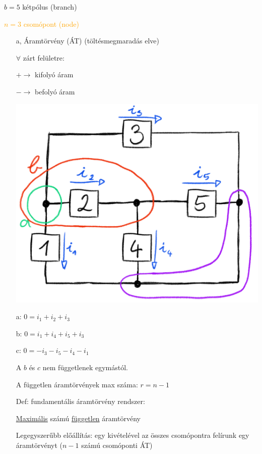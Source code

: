 \documentclass[12pt]{article}
\begin{document}
            $b = 5$ kétpólus (branch)

            \textcolor{orange}{$n = 3$ csomópont (node)}

            \begin{itemize}
                \item[a,] Áramtörvény (ÁT) (töltésmegmaradás elve)
                 
                    $ \forall$ zárt felületre: 

                    $+ \rightarrow$ kifolyó áram

                    $- \rightarrow$ befolyó áram

                    \includegraphics{img/8.png}

                    a: $0=i_1+i_2+i_3$

                    b: $0=i_1+i_4+i_5+i_3$
                    
                    c: $0=-i_3-i_5-i_4-i_1$

                    A $b$ és $c$ nem függetlenek egymástól.

                    A független áramtörvények max száma: $r=n-1$

                    Def: fundamentális áramtörvény rendszer:

                    \underline{Maximális} számú \underline{független} áramtörvény

                    Legegyszerűbb előállítás: egy kivételével az összes csomópontra felírunk egy áramtörvényt ($n-1$ számú csomóponti ÁT)


\end{itemize}
\end{document}
